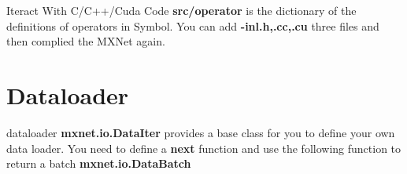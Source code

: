 \documentclass[english, nochinese]{../TeXTemplate/pkuslide}
\begin{document}
\begin{frame}{Iteract With C/C++/Cuda Code}
\textbf{src/operator} is the dictionary of the definitions of operators in Symbol. You can add \textbf{-inl.h,.cc,.cu} three files and then complied the MXNet again.
\end{frame}

\section{Dataloader}
\begin{frame}{dataloader}
\textbf{mxnet.io.DataIter} provides a base class for you to define your own data loader. You need to define a \textbf{next} function and use the following function to return a batch \textbf{mxnet.io.DataBatch}

\end{frame}
\end{document}
